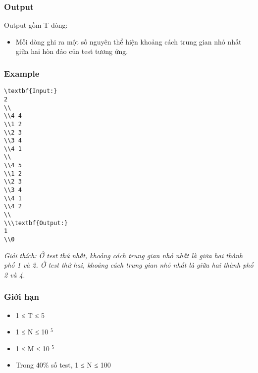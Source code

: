 \subsubsection{   Output  }

   Output gồm T dòng:  
\begin{itemize}
	\item     Mỗi dòng ghi ra một số nguyên thể hiện khoảng cách trung gian nhỏ nhất giữa hai hòn đảo của test tương ứng.   
\end{itemize}

\subsubsection{   Example  }
\begin{verbatim}
\textbf{Input:}
2
\\
\\4 4
\\1 2
\\2 3
\\3 4
\\4 1
\\
\\4 5 
\\1 2
\\2 3
\\3 4
\\4 1
\\4 2
\\
\\\textbf{Output:}
1
\\0\end{verbatim}

\emph{    Giải thích: Ở test thứ nhất, khoảng cách trung gian nhỏ nhất là giữa hai thành phố 1 và 2. Ở test thứ hai, khoảng cách trung gian nhỏ nhất là giữa hai thành phố 2 và 4.   }

\subsubsection{   Giới hạn  }
\begin{itemize}
	\item     1 ≤ T ≤ 5   
	\item     1 ≤ N ≤ 10    $^     5    $
	\item     1 ≤ M ≤ 10    $^     5    $
	\item     Trong 40\% số test, 1 ≤ N ≤ 100   
\end{itemize}